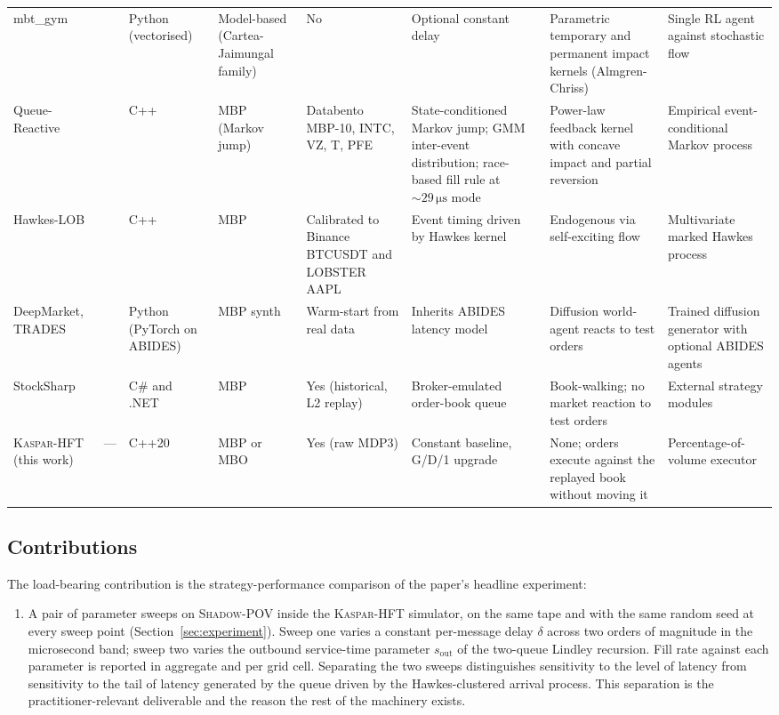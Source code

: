 \documentclass[11pt]{article}
\newcommand{\kasparhft}{\textsc{Kaspar-HFT}}
\newcommand{\shadowpov}{\textsc{Shadow-POV}}
\begin{document}
\begin{table}
\begin{tabular}{@{}p{1.9cm}p{1.9cm}p{2.2cm}p{1.9cm}p{2.1cm}p{3.1cm}p{3.1cm}p{3.0cm}@{}}
mbt\_gym & \citet{jerome2023mbtgym} & Python (vectorised) & Model-based (Cartea-Jaimungal family) & No & Optional constant delay & Parametric temporary and permanent impact kernels (Almgren-Chriss) & Single RL agent against stochastic flow \\
Queue-Reactive & \citet{noble2026reality} & C++ & MBP (Markov jump) & Databento MBP-10, INTC, VZ, T, PFE & State-conditioned Markov jump; GMM inter-event distribution; race-based fill rule at $\sim 29\,\si{\micro\second}$ mode & Power-law feedback kernel with concave impact and partial reversion & Empirical event-conditional Markov process \\
Hawkes-LOB & \citet{elkarmi2025hawkeslob} & C++ & MBP & Calibrated to Binance BTCUSDT and LOBSTER AAPL & Event timing driven by Hawkes kernel & Endogenous via self-exciting flow & Multivariate marked Hawkes process \\
DeepMarket, TRADES & \citet{berti2025deepmarket} & Python (PyTorch on ABIDES) & MBP synth & Warm-start from real data & Inherits ABIDES latency model & Diffusion world-agent reacts to test orders & Trained diffusion generator with optional ABIDES agents \\
StockSharp & \citet{stocksharp} & C\# and .NET & MBP & Yes (historical, L2 replay) & Broker-emulated order-book queue & Book-walking; no market reaction to test orders & External strategy modules \\
\kasparhft{} (this work) & --- & C++20 & MBP or MBO & Yes (raw MDP3) & Constant baseline, G/D/1 upgrade & None; orders execute against the replayed book without moving it & Percentage-of-volume executor \\
\bottomrule
\end{tabular}
\end{table}

\subsection{Contributions}
\label{sec:contributions}

The load-bearing contribution is the strategy-performance comparison of the paper's headline experiment:

\begin{enumerate}
    \item A pair of parameter sweeps on \shadowpov{} \citep{mayeski2026shadowpov} inside the \kasparhft{} simulator, on the same tape and with the same random seed at every sweep point (Section~\ref{sec:experiment}). Sweep one varies a constant per-message delay $\delta$ across two orders of magnitude in the microsecond band; sweep two varies the outbound service-time parameter $s_{\mathrm{out}}$ of the two-queue Lindley recursion. Fill rate against each parameter is reported in aggregate and per grid cell. Separating the two sweeps distinguishes sensitivity to the level of latency from sensitivity to the tail of latency generated by the queue driven by the Hawkes-clustered arrival process. This separation is the practitioner-relevant deliverable and the reason the rest of the machinery exists.
\end{enumerate}
\end{document}
